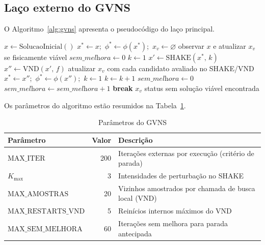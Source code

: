 \documentclass[12pt,a4paper]{article}
\begin{document}
\subsection{Laço externo do GVNS}

O Algoritmo~\ref{alg:gvns} apresenta o pseudocódigo do laço principal.

\begin{algorithm}[H]
\caption{GVNS mono-objetivo}
\label{alg:gvns}
\begin{algorithmic}[1]
\State $x \gets \text{SolucaoInicial}()$
\State $x^* \gets x$;\ $\phi^* \gets \phi(x^*)$;\ $x_v \gets \varnothing$
\State observar $x$ e atualizar $x_v$ se fisicamente viável
\State $\textit{sem\_melhora} \gets 0$
    \State $k \gets 1$
        \State $x' \gets \text{SHAKE}(x^*,\, k)$
        \State $x'' \gets \text{VND}(x',\, f)$
        \State atualizar $x_v$ com cada candidato avaliado no SHAKE/VND
            \State $x^* \gets x''$;\ $\phi^* \gets \phi(x'')$;\ $k \gets 1$
        \Else
            \State $k \gets k + 1$
        \EndIf
    \EndWhile
        \State $\textit{sem\_melhora} \gets 0$
    \Else
        \State $\textit{sem\_melhora} \gets \textit{sem\_melhora} + 1$
            \State \textbf{break}
        \EndIf
    \EndIf
\EndFor
{}
    \State \Return $x_v$ 
\Else
    \State \Return status sem solução viável encontrada
\EndIf
\end{algorithmic}
\end{algorithm}

Os parâmetros do algoritmo estão resumidos na Tabela~\ref{tab:parametros}.

\begin{table}[H]
\centering
\caption{Parâmetros do GVNS}
\label{tab:parametros}
\small
\begin{tabular}{@{}l r p{}@{}}
\toprule
Parâmetro & Valor & Descrição \\
\midrule
$\text{MAX\_ITER}$         & 200 & Iterações externas por execução (critério de parada) \\
$K_{\max}$                 & 3   & Intensidades de perturbação no SHAKE \\
$\text{MAX\_AMOSTRAS}$     & 20  & Vizinhos amostrados por chamada de busca local (VND) \\
$\text{MAX\_RESTARTS\_VND}$& 5   & Reinícios internos máximos do VND \\
$\text{MAX\_SEM\_MELHORA}$ & 60  & Iterações sem melhora para parada antecipada \\
\bottomrule
\end{tabular}
\end{table}
\end{document}
